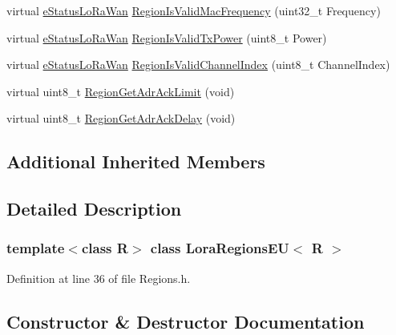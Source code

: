 \begin{DoxyCompactItemize}
\item 
virtual \mbox{\hyperlink{_define_8h_a1cea710adbbf5b02bced8f79cd82f7b9}{e\+Status\+Lo\+Ra\+Wan}} \mbox{\hyperlink{class_lora_regions_e_u_a192e8af5bcab83f1f7ff48b5d130206e}{Region\+Is\+Valid\+Mac\+Frequency}} (uint32\+\_\+t Frequency)
\item 
virtual \mbox{\hyperlink{_define_8h_a1cea710adbbf5b02bced8f79cd82f7b9}{e\+Status\+Lo\+Ra\+Wan}} \mbox{\hyperlink{class_lora_regions_e_u_ac28aa9ff150676c7f1dd7425dbb6fffa}{Region\+Is\+Valid\+Tx\+Power}} (uint8\+\_\+t Power)
\item 
virtual \mbox{\hyperlink{_define_8h_a1cea710adbbf5b02bced8f79cd82f7b9}{e\+Status\+Lo\+Ra\+Wan}} \mbox{\hyperlink{class_lora_regions_e_u_a265374672b836ead15fe670d9207bf4e}{Region\+Is\+Valid\+Channel\+Index}} (uint8\+\_\+t Channel\+Index)
\item 
virtual uint8\+\_\+t \mbox{\hyperlink{class_lora_regions_e_u_aed553b79468100fb271bb2ac6a230c58}{Region\+Get\+Adr\+Ack\+Limit}} (void)
\item 
virtual uint8\+\_\+t \mbox{\hyperlink{class_lora_regions_e_u_a4e27410febd49bfc58d3bf986177c1e7}{Region\+Get\+Adr\+Ack\+Delay}} (void)
\end{DoxyCompactItemize}
\subsection*{Additional Inherited Members}


\subsection{Detailed Description}
\subsubsection*{template$<$class R$>$\newline
class Lora\+Regions\+E\+U$<$ R $>$}



Definition at line 36 of file Regions.\+h.



\subsection{Constructor \& Destructor Documentation}
\mbox{\label{class_lora_regions_e_u_ae819c451aa7c913b67386705ed993645}} 
